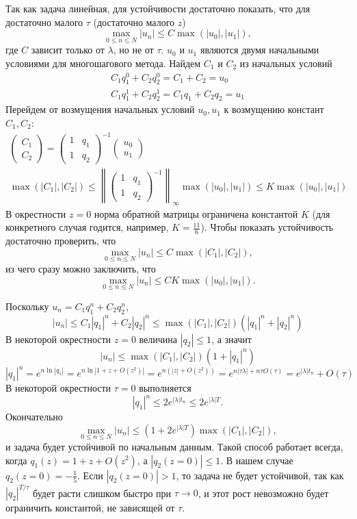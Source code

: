 \documentclass[12pt]{article}
\begin{document}
Так как задача линейная, для устойчивости достаточно показать, что для достаточно малого $\tau$ (достаточно малого $z$)
\[
\max_{0 \leqslant n \leqslant N} |u_n| \leqslant C \max(|u_0|, |u_1|),
\]
где $C$ зависит только от $\lambda$, но не от $\tau$. $u_0$ и $u_1$ являются двумя начальными условиями для многошагового метода. Найдем $C_1$ и $C_2$ из начальных условий
\begin{gather*}
C_1 q_1^0 + C_2 q_2^0 = C_1 + C_2 = u_0\\
C_1 q_1^1 + C_2 q_2^1 = C_1 q_1 + C_2 q_2 = u_1
\end{gather*}
Перейдем от возмущения начальных условий $u_0, u_1$ к возмущению констант $C_1, C_2$:
\begin{gather*}
\begin{pmatrix}
C_1 \\ C_2
\end{pmatrix} = 
\begin{pmatrix}
1 & q_1\\
1 & q_2
\end{pmatrix}^{-1}
\begin{pmatrix}
u_0 \\ u_1
\end{pmatrix}\\
\max(|C_1|, |C_2|) \leqslant 
\left\|
\begin{pmatrix}
1 & q_1\\
1 & q_2
\end{pmatrix}^{-1}
\right\|_{\infty} 
\max(|u_0|, |u_1|)
\leqslant K \max(|u_0|, |u_1|)
\end{gather*}
В окрестности $z = 0$ норма обратной матрицы ограничена константой $K$ (для конкретного случая годится, например, $K = \frac{11}{6}$). 
Чтобы показать устойчивость достаточно проверить, что
\[
\max_{0 \leqslant n \leqslant N} |u_n| \leqslant C \max(|C_1|, |C_2|),
\]
из чего сразу можно заключить, что
\[
\max_{0 \leqslant n \leqslant N} |u_n| \leqslant CK \max(|u_0|, |u_1|).
\]

Поскольку $u_n = C_1 q_1^n + C_2 q_2^n$,
\[
|u_n| \leqslant C_1 |q_1|^n + C_2 |q_2|^n \leqslant \max(|C_1|, |C_2|) (|q_1|^n + |q_2|^n)
\]
В некоторой окрестности $z = 0$ величина $|q_2| \leqslant 1$, а значит
\[
|u_n| \leqslant \max(|C_1|, |C_2|) (1 + |q_1|^n)
\]
\[
|q_1|^n = e^{n \ln |q_1|} = e^{n \ln |1 + z + O(z^2)|} = e^{n (|z| + O(z^2))} = e^{n|\tau\lambda| + n\tau O(\tau)} = e^{|\lambda|t_n} + O(\tau)
\]
В некоторой окрестности $\tau = 0$ выполняется
\[
|q_1|^n \leqslant 2 e^{|\lambda| t_n} \leqslant 2 e^{|\lambda| T}.
\]
Окончательно
\[
\max_{0 \leqslant n \leqslant N} |u_n| \leq (1 + 2 e^{|\lambda| T}) \max (|C_1|, |C_2|),
\]
и задача будет устойчивой по начальным данным. Такой способ работает всегда, когда 
$q_1(z) = 1 + z + O(z^2)$, а $|q_2(z = 0)| \leqslant 1$. В нашем случае $q_2(z = 0) = -\frac{1}{5}$.
Если $|q_2(z=0)| > 1$, то задача не будет устойчивой, так как $|q_2|^{T/\tau}$ будет расти слишком быстро при $\tau \rightarrow 0$, и этот рост невозможно будет ограничить константой, не зависящей от $\tau$.
\end{document}
